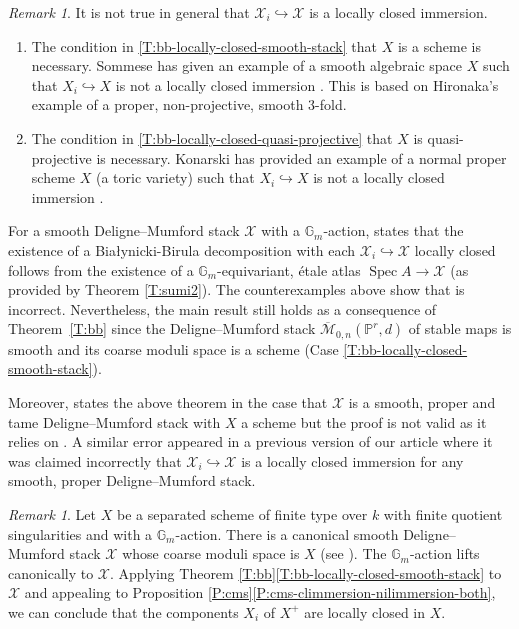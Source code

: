 \documentclass[a4paper]{amsart}
\theoremstyle{plain}
\theoremstyle{definition}
\theoremstyle{remark}
\newtheorem{remark}[theorem]{Remark}
\numberwithin{equation}{section}
\newcommand{\GG}{\mathbb{G}}
\newcommand{\PP}{\mathbb{P}}
\newcommand\cM{\mathcal{M}}
\newcommand\cX{\mathcal{X}}
\DeclareMathOperator{\Spec}{Spec}
\begin{document}
\begin{remark} It is not true in general that $\cX_i \hookrightarrow \cX$ is a locally closed immersion.
\begin{enumerate}
\item The condition in \eqref{T:bb-locally-closed-smooth-stack} that $X$ is a scheme is necessary.    Sommese has given an example of a smooth algebraic space $X$ such that $X_i \hookrightarrow X$ is not a locally closed immersion \cite{sommese}. This is based on Hironaka's example of a proper, non-projective, smooth 3-fold.
\item The condition in \eqref{T:bb-locally-closed-quasi-projective} that $X$ is quasi-projective is necessary.  Konarski has provided an example of a normal proper scheme $X$ (a toric variety) such that $X_i \hookrightarrow X$ is not a locally closed immersion \cite{konarski}.
\end{enumerate}

For a smooth Deligne--Mumford stack $\cX$ with a $\GG_m$-action, \cite[Prop.~5]{oprea} states that the existence of a Bia\l ynicki-Birula decomposition with each $\cX_i \hookrightarrow \cX$ locally closed follows from the existence of a $\GG_m$-equivariant, \'etale atlas $\Spec A \to \cX$ (as provided by Theorem \ref{T:sumi2}).  The counterexamples above show that \cite[Prop.~5]{oprea} is incorrect.  Nevertheless, the main result \cite[Thm.\ 2]{oprea} still holds as a consequence of Theorem~\ref{T:bb} since the Deligne--Mumford stack $\overline{\cM}_{0,n}(\PP^r,d)$ of stable maps is smooth and its coarse moduli space is a scheme (Case \eqref{T:bb-locally-closed-smooth-stack}).

Moreover, \cite[Thm.~3.5]{skowera} states the above theorem in the case that $\cX$ is a smooth, proper and tame Deligne--Mumford stack with $X$ a scheme but the proof is not valid as it relies on \cite[Prop.~5]{oprea}.  A similar error appeared in a previous version of our article where it was claimed incorrectly that $\cX_i \hookrightarrow \cX$ is a locally closed immersion for any smooth, proper Deligne--Mumford stack.
\end{remark}

\begin{remark} Let $X$ be a separated scheme of finite type over $k$ with finite quotient singularities and with a $\GG_m$-action.  There is a canonical smooth Deligne--Mumford stack $\cX$ whose coarse moduli space is $X$ (see \cite[\S 4.1]{fantechi-mann-nironi}).  The $\GG_m$-action lifts canonically to $\cX$.  Applying 
Theorem \ref{T:bb}\eqref{T:bb-locally-closed-smooth-stack} to $\cX$ and appealing to Proposition \ref{P:cms}\eqref{P:cms-climmersion-nilimmersion-both}, we can conclude that the components $X_i$ of $X^+$ are locally closed in $X$.
\end{remark}
\end{document}
